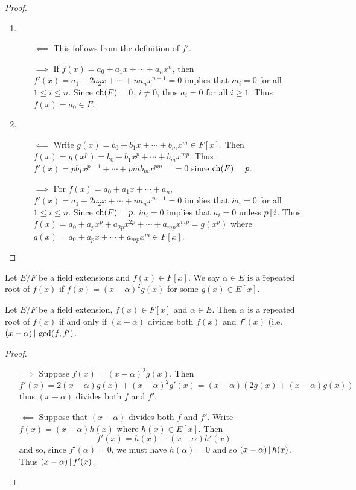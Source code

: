 \documentclass[11pt]{article}
\begin{document}
\begin{proof}\,
    \begin{enumerate}
        \item\begin{itemize}
            \item[$\impliedby$] This follows from the definition of $f'$.
            \item[$\implies$] If $f(x)=a_0+a_1x+\cdots+a_nx^n$, then $f'(x)=a_1+2a_2x+\cdots+na_nx^{n-1}=0$ implies that $ia_i=0$ for all $1\leq i\leq n$. Since $\operatorname{ch}(F)=0$, $i\neq0$, thus $a_i=0$ for all $i\geq1$. Thus $f(x)=a_0\in F$.
        \end{itemize}
        \item\begin{enumerate}
            \item[$\impliedby$] Write $g(x)=b_0+b_1x+\cdots+b_mx^m\in F[x]$. Then $f(x)=g(x^p)=b_0+b_1x^p+\cdots+b_mx^{mp}$. Thus $f'(x)=pb_1x^{p-1}+\cdots+pmb_mx^{pm-1}=0$ since $\operatorname{ch}(F)=p$.
            \item[$\implies$] For $f(x)=a_0+a_1x+\cdots+a_n$, $f'(x)=a_1+2a_2x+\cdots+na_nx^{n-1}=0$ implies that $ia_i=0$ for all $1\leq i\leq n$. Since $\operatorname{ch}(F)=p$, $ia_i=0$ implies that $a_i=0$ unless $p\,|\, i$. Thus $f(x)=a_0+a_px^p+a_{2p}x^{2p}+\cdots+a_{mp}x^{mp}=g(x^p)$ where $g(x)=a_0+a_px+\cdots+a_{mp}x^m\in F[x]$.
        \end{enumerate}
    \end{enumerate}
\end{proof}

\begin{definition}
    Let $E/F$ be a field extensions and $f(x)\in F[x]$. We say $\alpha\in E$ is a \u{repeated root} of $f(x)$ if $f(x)=(x-\alpha)^2g(x)$ for some $g(x)\in E[x]$.
\end{definition}

\begin{theorem}
    Let $E/F$ be a field extension, $f(x)\in F[x]$ and $\alpha\in E$. Then $\alpha$ is a repeated root of $f(x)$ if and only if $(x-\alpha)$ divides both $f(x)$ and $f'(x)$ (i.e. $(x-\alpha)\,|\, \gcd(f,f')$.
\end{theorem}

\begin{proof}\,
    \begin{itemize}
        \item[$\implies$] Suppose $f(x)=(x-\alpha)^2g(x)$. Then
        \[f'(x)=2(x-\alpha)g(x)+(x-\alpha)^2g'(x)=(x-\alpha)(2g(x)+(x-\alpha)g(x))\]
        thus $(x-\alpha)$ divides both $f$ and $f'$.
        \item[$\impliedby$] Suppose that $(x-\alpha)$ divides both $f$ and $f'$. Write $f(x)=(x-\alpha)h(x)$ where $h(x)\in E[x]$. Then
        \[f'(x)=h(x)+(x-\alpha)h'(x)\]
        and so, since $f'(\alpha)=0$, we must have $h(\alpha)=0$ and so $(x-\alpha)\,|\, h(x)$. Thus $(x-\alpha)\,|\, f'(x)$.
    \end{itemize}
\end{proof}
\end{document}
